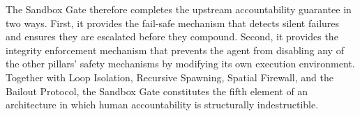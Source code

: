 The Sandbox Gate therefore completes the upstream accountability guarantee in two ways. First, it provides the fail-safe mechanism that detects silent failures and ensures they are escalated before they compound. Second, it provides the integrity enforcement mechanism that prevents the agent from disabling any of the other pillars' safety mechanisms by modifying its own execution environment. Together with Loop Isolation, Recursive Spawning, Spatial Firewall, and the Bailout Protocol, the Sandbox Gate constitutes the fifth element of an architecture in which human accountability is structurally indestructible.